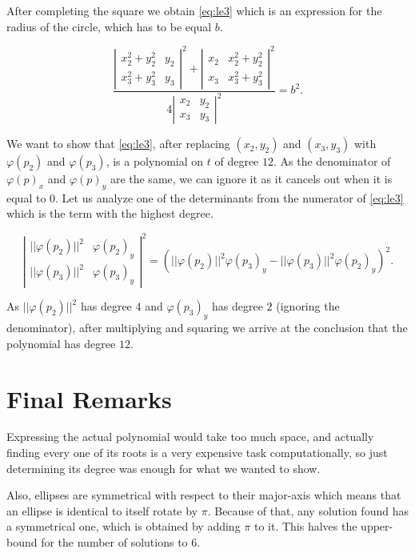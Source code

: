 After completing the square we obtain \autoref{eq:le3} which is an expression for the radius of the circle, which has to be equal $b$.

\begin{equation}\label{eq:le3}
\dfrac{\left|
	\begin{array}{cc}
	x_2^2+y_2^2&y_2\\
	x_3^2+y_3^2&y_3
	\end{array}\right|^2
+\left|
\begin{array}{cc}
x_2&x_2^2+y_2^2\\
x_3&x_3^2+y_3^2
\end{array}\right|^2
}{4\left|
\begin{array}{cc}
x_2&y_2\\
x_3&y_3
\end{array}\right|^2} = b^2.
\end{equation}

We want to show that \autoref{eq:le3}, after replacing $(x_2, y_2)$ and $(x_3, y_3)$ with $\varphi(p_2)$ and $\varphi(p_3)$, is a polynomial on $t$ of degree $12$. As the denominator of $\varphi(p)_x$ and $\varphi(p)_y$ are the same, we can ignore it as it cancels out when it is equal to $0$. Let us analyze one of the determinants from the numerator of \autoref{eq:le3} which is the term with the highest degree.

\begin{equation}\label{eq:num1}
\left|
	\begin{array}{cc}
	||\varphi(p_2)||^2&\varphi(p_2)_y\\
	||\varphi(p_3)||^2&\varphi(p_3)_y
	\end{array}\right|^2=(||\varphi(p_2)||^2\varphi(p_3)_y-||\varphi(p_3)||^2\varphi(p_2)_y)^2.
\end{equation}

As $||\varphi(p_2)||^2$ has degree $4$ and $\varphi(p_3)_y$ has degree $2$ (ignoring the denominator), after multiplying and squaring we arrive at the conclusion that the polynomial has degree $12$.

\section{Final Remarks}

Expressing the actual polynomial would take too much space, and actually finding every one of its roots is a very expensive task computationally, so just determining its degree was enough for what we wanted to show.

Also, ellipses are symmetrical with respect to their major-axis which means that an ellipse is identical to itself rotate by $\pi$. Because of that, any solution found has a symmetrical one, which is obtained by adding $\pi$ to it. This halves the upper-bound for the number of solutions to $6$.